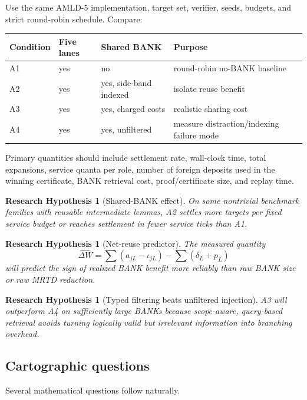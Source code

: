 \documentclass[11pt]{article}
\newtheorem{hypothesis}[definition]{Research Hypothesis}
\begin{document}
Use the same AMLD-5 implementation, target set, verifier, seeds, budgets, and strict round-robin schedule. Compare:
\begin{center}
\begin{tabular}{@{}llll@{}}
\toprule
Condition & Five lanes & Shared BANK & Purpose \\
\midrule
A1 & yes & no & round-robin no-BANK baseline \\
A2 & yes & yes, side-band indexed & isolate reuse benefit \\
A3 & yes & yes, charged costs & realistic sharing cost \\
A4 & yes & yes, unfiltered & measure distraction/indexing failure mode \\
\bottomrule
\end{tabular}
\end{center}

Primary quantities should include settlement rate, wall-clock time, total expansions, service quanta per role, number of foreign deposits used in the winning certificate, BANK retrieval cost, proof/certificate size, and replay time.

\begin{hypothesis}[Shared-BANK effect]
On some nontrivial benchmark families with reusable intermediate lemmas, A2 settles more targets per fixed service budget or reaches settlement in fewer service ticks than A1.
\end{hypothesis}

\begin{hypothesis}[Net-reuse predictor]
The measured quantity
\[
\widehat{\Delta W}
=
\sum(a_{jL}-\iota_{jL})-\sum(\delta_L+p_L)
\]
will predict the sign of realized BANK benefit more reliably than raw BANK size or raw MRTD reduction.
\end{hypothesis}

\begin{hypothesis}[Typed filtering beats unfiltered injection]
A3 will outperform A4 on sufficiently large BANKs because scope-aware, query-based retrieval avoids turning logically valid but irrelevant information into branching overhead.
\end{hypothesis}

\subsection{Cartographic questions}

Several mathematical questions follow naturally.
\end{document}
